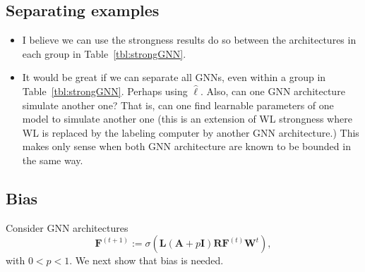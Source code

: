 \subsection{Separating examples}

\begin{itemize}
	\item I believe we can use the strongness results do so between the architectures in each group in Table~\ref{tbl:strongGNN}.
	\item It would be great if we can separate all GNNs, even within a group in  Table~\ref{tbl:strongGNN}. Perhaps using $\hat{\pmb{\ell}}$. Also, can one GNN architecture simulate another one? That is, can one find learnable parameters of one model to simulate another one (this is an extension of WL strongness where WL is replaced by the labeling computer by another GNN architecture.) This makes only sense when both GNN architecture are known to be bounded in the same way.
\end{itemize}


\subsection{Bias}
Consider  GNN architectures 
$$\mathbf{F}^{(t+1)}:=\sigma(\mathbf{L}(\mathbf{A}+p\mathbf{I})\mathbf{R}\mathbf{F}^{(t)}\mathbf{W}^{t}),	
$$
with $0<p<1$. We next show that bias is needed.

